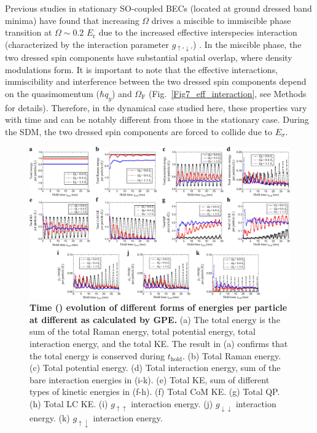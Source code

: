\documentclass[showpacs,preprintnumbers,amsmath,amssymb, superscriptaddress, aps, reprint]{revtex4-1}
\def\E_r{E_{\text{r}}}
\def\OmegaF{\Omega_{\text{F}}}
\def\thold{t_{\text{hold}}}
\begin{document}
{{{Previous studies in stationary SO-coupled BECs (located at ground dressed band minima) have found that increasing $\Omega$ drives a miscible to immiscible phase transition at $\Omega \sim 0.2$ $\E_r$ due to the increased effective interspecies interaction (characterized by the interaction parameter $g_{\uparrow'\downarrow'}$)  \cite{Lin_SOC_Nature_2011,Zhai_SOC_2010,Ho_PhysRevLett2011,Stringari_SOC_PRL2012,Ji_FiniteTemp_NP_2014}. In the miscible phase, the two dressed spin components have  substantial spatial overlap, where density modulations form. 
It is important to note that the effective interactions, immiscibility and interference between the two dressed spin components depend on the quasimomentum ($\hbar q_y$) and $\OmegaF$ ({Fig.~{\ref{Fig7_eff_interaction}}, see Methods for details}). Therefore, in the dynamical case studied here, these properties vary with time and can be notably different from those in the stationary case. During the SDM, the two dressed spin components are forced to collide due to $E_{\sigma}$. 
\begin{figure}[t]
\centering
\includegraphics[width=7.0in]{Fig8_Energy_Vfinal.pdf}
\caption{{\textbf{Time ({\boldmath{$\thold$}}) evolution of different forms of energies per particle at different {\boldmath{$\OmegaF$}} as calculated by GPE.}} (a) The total energy is the sum of the total Raman energy, total potential energy, total interaction energy, and the total KE. The result in (a) confirms that the total energy is conserved during $\thold$. (b) Total Raman energy. (c) Total potential energy. (d) Total interaction energy, sum of the bare interaction energies in (i-k). (e) Total KE, sum of different types of kinetic energies in (f-h). (f) Total CoM KE. (g) Total QP. (h) Total LC KE. (i) $g_{\uparrow\uparrow}$ interaction energy. (j) $g_{\downarrow\downarrow}$ interaction energy. (k) $g_{\uparrow\downarrow}$ interaction energy.} 

\end{figure}}}}
\end{document}
